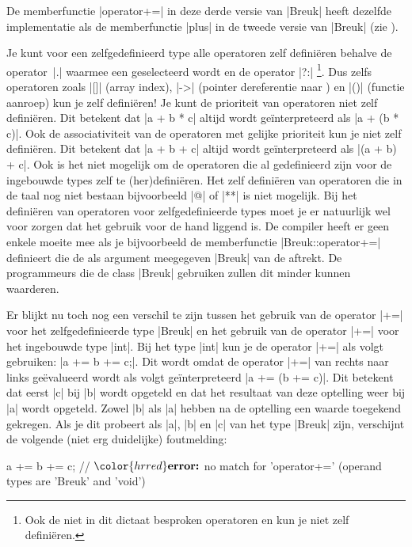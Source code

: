 \begin{cpplstShortInline}
De memberfunctie |operator+=| in deze derde versie van |Breuk| heeft dezelfde implementatie als de memberfunctie |plus| in de tweede versie van |Breuk| (zie ).

Je kunt voor een zelfgedefinieerd type alle operatoren zelf definiëren behalve de operator~|.| waarmee een  geselecteerd wordt en de operator |?:|%
\footnote{%
    Ook de niet in dit dictaat besproken operatoren  en  kun je niet zelf definiëren.
}. 
Dus zelfs operatoren zoals |[]| (array index), |->| (pointer dereferentie naar ) en |()| (functie aanroep) kun je zelf definiëren! 
Je kunt de prioriteit van operatoren niet zelf definiëren. Dit betekent dat |a + b * c| altijd wordt geïnterpreteerd als |a + (b * c)|.
Ook de associativiteit van de operatoren met gelijke prioriteit kun je niet zelf definiëren. 
Dit betekent dat |a + b + c| altijd wordt geïnterpreteerd als |(a + b) + c|. 
Ook is het niet mogelijk om de operatoren die al gedefinieerd zijn voor de ingebouwde types zelf te (her)definiëren. 
Het zelf definiëren van operatoren die in de taal \Cpp{} nog niet bestaan bijvoorbeeld |@| of |**| is niet mogelijk. 
Bij het definiëren van operatoren voor zelfgedefinieerde types moet je er natuurlijk wel voor zorgen dat het gebruik voor de hand
liggend is. 
De compiler heeft er geen enkele moeite mee als je bijvoorbeeld de memberfunctie |Breuk::operator+=| definieert die de als argument meegegeven |Breuk| van de  aftrekt. 
De programmeurs die de class |Breuk| gebruiken zullen dit minder kunnen waarderen.

Er blijkt nu toch nog een verschil te zijn tussen het gebruik van de operator |+=| voor het zelfgedefinieerde type |Breuk| en het gebruik van de operator |+=| voor het ingebouwde type |int|. 
Bij het type |int| kun je de operator |+=| als volgt gebruiken: |a += b += c;|. 
Dit wordt omdat de operator |+=| van rechts naar links geëvalueerd wordt als volgt geïnterpreteerd |a += (b += c)|. 
Dit betekent dat eerst |c| bij |b| wordt opgeteld en dat het resultaat van deze optelling weer bij |a| wordt opgeteld. 
Zowel |b| als |a| hebben na de optelling een waarde toegekend gekregen. 
Als je dit probeert als |a|, |b| en |c| van het type |Breuk| zijn, verschijnt de volgende (niet erg duidelijke) foutmelding:

\begin{cpplstfragment}[mathescape=true]
    a += b += c;
//  $\color{hrred}\textbf{error:}$ no match for 'operator+=' (operand types are 'Breuk' and 'void')
\end{cpplstfragment}


\end{cpplstShortInline}
